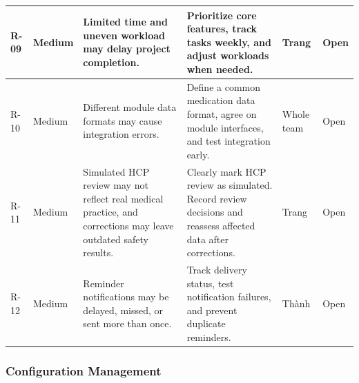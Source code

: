 \begin{longtable}{|L{0.07\textwidth}|L{0.10\textwidth}|L{0.27\textwidth}|L{0.25\textwidth}|L{0.12\textwidth}|L{0.09\textwidth}|}
R-09 & Medium
& Limited time and uneven workload may delay
project completion.
& Prioritize core features, track tasks weekly,
and adjust workloads when needed.
& Trang & Open\\ \hline

R-10 & Medium
& Different module data formats may cause
integration errors.
& Define a common medication data format,
agree on module interfaces, and test integration early.
& Whole team & Open\\ \hline

R-11 & Medium
& Simulated HCP review may not reflect
real medical practice, and corrections may
leave outdated safety results.
& Clearly mark HCP review as simulated.
Record review decisions and reassess
affected data after corrections.
& Trang & Open\\ \hline

R-12 & Medium
& Reminder notifications may be delayed,
missed, or sent more than once.
& Track delivery status, test notification failures,
and prevent duplicate reminders.
& Thành & Open\\ \hline

\end{longtable}


\subsubsection{Configuration Management}


